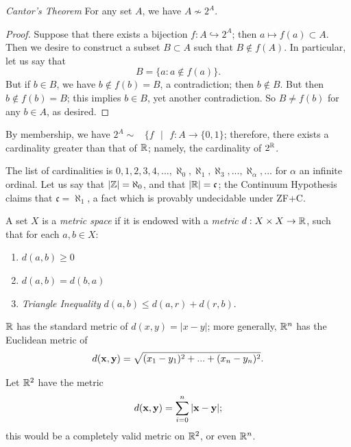 \begin{theorem}
	\emph{Cantor's Theorem} For any set $A$, we have $A \not\sim 2^A$.
\end{theorem}
\begin{proof}
	Suppose that there exists a bijection $f:A\hookrightarrow 2^A$; then $a\mapsto f(a)\subset A$. Then we desire to construct a subset $B\subset A$ such that $B\not\in f(A)$. In particular, let us say that $$B=\{a:a\not\in f(a)\}.$$
    But if $b\in B$, we have $b\not\in f(b)=B$, a contradiction; then $b\not\in B$. But then $b\not\in f(b)=B$; this implies $b\in B$, yet another contradiction. So $B\neq f(b)$ for any $b\in A$, as desired.
    
\end{proof}

\begin{eg}
	By membership, we have $2^A\sim$ \ $\{f\text{ }| \text{ }f:A\rightarrow \{0,1\}$; therefore, there exists a cardinality greater than that of $\mathbb{R}$; namely, the cardinality of $2^{\mathbb{R}}$.
\end{eg}
The list of cardinalities is $0,1,2,3,4,...,\aleph_0,\aleph_1,\aleph_3,...,\aleph_\alpha,...$ for $\alpha$ an infinite ordinal. Let us say that $|\mathbb{Z}| = \aleph_0$, and that $|\mathbb{R}|=\mathfrak{c}$; the Continuum Hypothesis claims that $\mathfrak{c}=\aleph_1$, a fact which is provably undecidable under ZF+C. 

\begin{definition}
    A set $X$ is a \emph{metric space} if it is endowed with a \emph{metric} $d:X\times X\rightarrow \mathbb{R}$, such that for each $a,b\in X$:
    \begin{enumerate}
        \item $d(a,b)\geq 0$
        \item $d(a,b)=d(b,a)$
        \item \emph{Triangle Inequality} $d(a,b) \leq d(a,r)+d(r,b)$.
    \end{enumerate}
\end{definition}

\begin{eg}
	$\mathbb{R}$ has the standard metric of $d(x,y)=|x-y|$; more generally, $\mathbb{R}^n$ has the Euclidean metric of $$d(\bold{x},\bold{y})=\sqrt{(x_1-y_1)^2+...+(x_n-y_n)^2}.$$
\end{eg}

\begin{eg}
	Let $\mathbb{R}^2$ have the metric $$d(\bold{x},\bold{y})=\sum^n_{i=0}|\bold{x}-\bold{y}|;$$ this would be a completely valid metric on $\mathbb{R}^2$, or even $\mathbb{R}^n$.
\end{eg}

